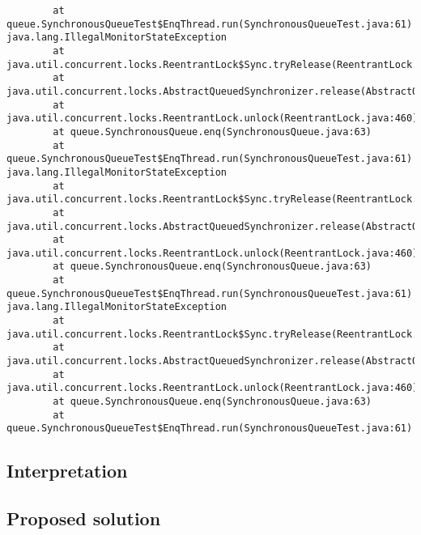 \begin{verbatim}
        at queue.SynchronousQueueTest$EnqThread.run(SynchronousQueueTest.java:61)
java.lang.IllegalMonitorStateException
        at java.util.concurrent.locks.ReentrantLock$Sync.tryRelease(ReentrantLock.java:155)
        at java.util.concurrent.locks.AbstractQueuedSynchronizer.release(AbstractQueuedSynchronizer.java:1260)
        at java.util.concurrent.locks.ReentrantLock.unlock(ReentrantLock.java:460)
        at queue.SynchronousQueue.enq(SynchronousQueue.java:63)
        at queue.SynchronousQueueTest$EnqThread.run(SynchronousQueueTest.java:61)
java.lang.IllegalMonitorStateException
        at java.util.concurrent.locks.ReentrantLock$Sync.tryRelease(ReentrantLock.java:155)
        at java.util.concurrent.locks.AbstractQueuedSynchronizer.release(AbstractQueuedSynchronizer.java:1260)
        at java.util.concurrent.locks.ReentrantLock.unlock(ReentrantLock.java:460)
        at queue.SynchronousQueue.enq(SynchronousQueue.java:63)
        at queue.SynchronousQueueTest$EnqThread.run(SynchronousQueueTest.java:61)
java.lang.IllegalMonitorStateException
        at java.util.concurrent.locks.ReentrantLock$Sync.tryRelease(ReentrantLock.java:155)
        at java.util.concurrent.locks.AbstractQueuedSynchronizer.release(AbstractQueuedSynchronizer.java:1260)
        at java.util.concurrent.locks.ReentrantLock.unlock(ReentrantLock.java:460)
        at queue.SynchronousQueue.enq(SynchronousQueue.java:63)
        at queue.SynchronousQueueTest$EnqThread.run(SynchronousQueueTest.java:61)
\end{verbatim}
\par
\subsection{Interpretation}
\par
\par
\subsection{Proposed solution}
\par
\par
